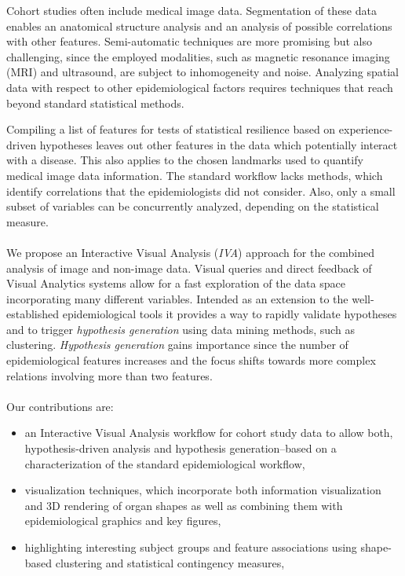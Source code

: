 \documentclass[journal]{style/vgtc} 			          %
\begin{document}
%
Cohort studies often include medical image data.
Segmentation of these data enables an anatomical structure analysis and an analysis of possible correlations with other features.
%
Semi-automatic techniques are more promising but also challenging, since the employed modalities, such as magnetic resonance imaging (MRI) and ultrasound, are subject to inhomogeneity and noise.
%
Analyzing spatial data with respect to other epidemiological factors requires techniques that reach beyond standard statistical methods.

Compiling a list of features for tests of statistical resilience based on experience-driven hypotheses leaves out other features in the data which potentially interact with a disease.
%
This also applies to the chosen landmarks used to quantify medical image data information.
%
The standard workflow lacks methods, which identify correlations that the epidemiologists did not consider.
%
Also, only a small subset of variables can be concurrently analyzed, depending on the statistical measure.
\\\\
We propose an Interactive Visual Analysis (\emph{IVA}) approach \cite{Thomas2005} for the combined analysis of image and non-image data.
%
Visual queries and direct feedback of Visual Analytics systems allow for a fast exploration of the data space incorporating many different variables.
%
Intended as an extension to the well-established epidemiological tools it provides a way to rapidly validate hypotheses and to trigger \emph{hypothesis generation} using data mining methods, such as clustering.
%
\emph{Hypothesis generation} gains importance since the number of epidemiological features increases and the focus shifts towards more complex relations involving more than two features.
\\\\
Our contributions are:
\begin{itemize}
	\item an Interactive Visual Analysis workflow for cohort study data to allow both, hypothesis-driven analysis and hypothesis generation--based on a characterization of the standard epidemiological workflow,
	\item visualization techniques, which incorporate both information visualization and 3D rendering of organ shapes as well as combining them with epidemiological graphics and key figures,
	\item highlighting interesting subject groups and feature associations using shape-based clustering and statistical contingency measures,
\end{itemize}
\end{document}
